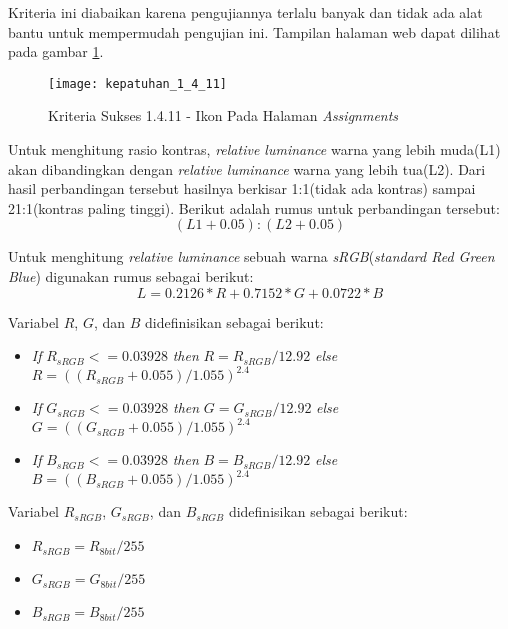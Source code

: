 Kriteria ini diabaikan karena pengujiannya terlalu banyak dan tidak ada alat bantu untuk mempermudah pengujian ini. Tampilan halaman web dapat dilihat pada gambar \ref{fig:kepatuhan_1_4_11_non_text_contrast}.
\begin{figure}[H]
	\centering  
	\texttt{[image: kepatuhan\_1\_4\_11]}  
	\caption[Kriteria Sukses 1.4.11 - Ikon Pada Halaman \textit{Assignments}]{Kriteria Sukses 1.4.11 - Ikon Pada Halaman \textit{Assignments}} 
	\label{fig:kepatuhan_1_4_11_non_text_contrast} 
\end{figure}

Untuk menghitung rasio kontras, \textit{relative luminance} warna yang lebih muda(L1) akan dibandingkan dengan \textit{relative luminance} warna yang lebih tua(L2). Dari hasil perbandingan tersebut hasilnya berkisar 1:1(tidak ada kontras) sampai 21:1(kontras paling tinggi). Berikut adalah rumus untuk perbandingan tersebut:
\begin{equation}
	(L1 + 0.05) : (L2 +0.05)
\end{equation}

Untuk menghitung \textit{relative luminance} sebuah warna \textit{sRGB}(\textit{standard Red Green Blue}) digunakan rumus sebagai berikut:
\begin{equation}
	L = 0.2126 * R + 0.7152 * G + 0.0722 * B
\end{equation}

Variabel $R$, $G$, dan $B$ didefinisikan sebagai berikut:
\begin{itemize}
	\item \textit{If} $R_{sRGB} <= 0.03928$ \textit{then} $R = R_{sRGB}/12.92$ \textit{else} $R = ((R_{sRGB} + 0.055)/1.055)^{2.4}$
	\item \textit{If} $G_{sRGB} <= 0.03928$ \textit{then} $G = G_{sRGB}/12.92$ \textit{else} $G = ((G_{sRGB} + 0.055)/1.055)^{2.4}$
	\item \textit{If} $B_{sRGB} <= 0.03928$ \textit{then} $B = B_{sRGB}/12.92$ \textit{else} $B = ((B_{sRGB} + 0.055)/1.055)^{2.4}$
\end{itemize}

Variabel $R_{sRGB}$, $G_{sRGB}$, dan $B_{sRGB}$ didefinisikan sebagai berikut:
\begin{itemize}
	\item $R_{sRGB} = R_{8bit} / 255$
	\item $G_{sRGB} = G_{8bit} / 255$
	\item $B_{sRGB} = B_{8bit} / 255$
\end{itemize}

